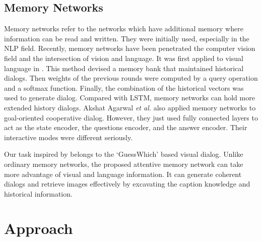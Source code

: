 \documentclass[review]{elsarticle}
\begin{document}
	\subsection{Memory Networks}
	Memory networks \cite{DBLP:journals/corr/WestonCB14, sukhbaatar2015end, xiong2016dynamic, vaswani2017attention, danihelka2016associative} refer to the networks which have additional memory where information can be read and written. They were initially used, especially in the NLP field.
	Recently, memory networks have been penetrated the computer vision field and the intersection of vision and language. It was first applied to visual language in \cite{DBLP:conf/cvpr/DasKGSYMPB17}. This method devised a memory bank that maintained historical dialogs. Then weights of the previous rounds were computed by a query operation and a softmax function. 
	Finally, the combination of the historical vectors was used to generate dialog. Compared with LSTM, memory networks can hold more extended history dialogs. 
	Akshat Agarwal \textit{et al.} \cite{DBLP:conf/atal/AgarwalGSLS19} also applied memory networks to goal-oriented cooperative dialog. However, they just used fully connected layers to act as the state encoder, the questions encoder, and the answer encoder. 
	Their interactive modes were different seriously.
	
	Our task inspired by \cite{DBLP:conf/iccv/DasKMLB17} belongs to the `GuessWhich' based visual dialog. Unlike ordinary memory networks, the proposed attentive memory network can take more advantage of visual and language information.
	It can generate coherent dialogs and retrieve images effectively by excavating the caption knowledge and historical information.

	\section{Approach}
	
\end{document}
